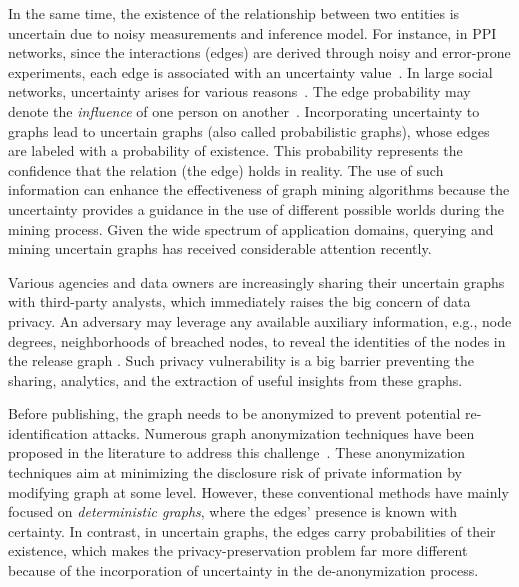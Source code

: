 In the same time, the existence of the relationship between two entities is uncertain due to noisy measurements and inference model. For instance, in PPI networks, since the interactions (edges) are derived through noisy and error-prone experiments, each edge is associated with an uncertainty value~\cite{Krogan_Global_2006}. In large social networks, uncertainty arises for various reasons~\cite{Adar_Managing_2007,Kempe_Maximizing_2003}. The edge probability may denote the \emph{influence} of one person on another~\cite{Kempe_Maximizing_2003}. Incorporating uncertainty to graphs lead to uncertain graphs (also called probabilistic graphs), whose edges are labeled with a probability of existence. This probability represents the confidence that the relation (the edge) holds in reality. The use of such information can enhance the effectiveness of graph mining algorithms because  the uncertainty provides a guidance in the use of different possible worlds during the mining process. Given the wide spectrum of application domains, querying and mining uncertain graphs has received considerable attention recently. 

Various agencies and data owners are increasingly sharing their uncertain graphs with third-party analysts, which immediately raises the big concern of data privacy.  An adversary may leverage any available auxiliary  information, e.g.,  node degrees, neighborhoods of breached nodes, to reveal the identities of the nodes in  the release graph \cite{Hay_Anonymizing_2007}. 
Such privacy vulnerability is a big barrier preventing the sharing, analytics, and the extraction of useful insights from these graphs. 

Before publishing, the graph needs to be anonymized to prevent potential re-identification attacks. Numerous graph anonymization techniques have been proposed in the literature to address this challenge~\cite{Liu_Towards_2008,Boldi_Injecting_2012, Mittal_Preserving_2013,Nguyen_Anonymizing_2015}. These anonymization techniques aim at minimizing the disclosure risk of private information by modifying graph at some level. However, these conventional methods have mainly focused on {\em deterministic graphs}, where the edges' presence is known with certainty.  In contrast, in uncertain graphs, the edges carry probabilities of their existence,  which makes the privacy-preservation problem far more different because of the incorporation of uncertainty in the de-anonymization process. 


